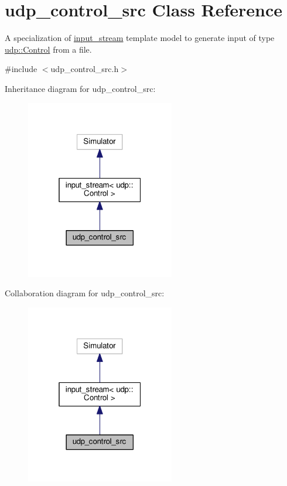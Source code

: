 \hypertarget{classudp__control__src}{}\section{udp\+\_\+control\+\_\+src Class Reference}
\label{classudp__control__src}


A specialization of \hyperlink{classinput__stream}{input\+\_\+stream} template model to generate input of type \hyperlink{structudp_1_1Control}{udp\+::\+Control} from a file.  




{\ttfamily \#include $<$udp\+\_\+control\+\_\+src.\+h$>$}



Inheritance diagram for udp\+\_\+control\+\_\+src\+:\nopagebreak
\begin{figure}[H]
\begin{center}
\leavevmode
\includegraphics[width=184pt]{classudp__control__src__inherit__graph}
\end{center}
\end{figure}


Collaboration diagram for udp\+\_\+control\+\_\+src\+:\nopagebreak
\begin{figure}[H]
\begin{center}
\leavevmode
\includegraphics[width=184pt]{classudp__control__src__coll__graph}
\end{center}
\end{figure}
